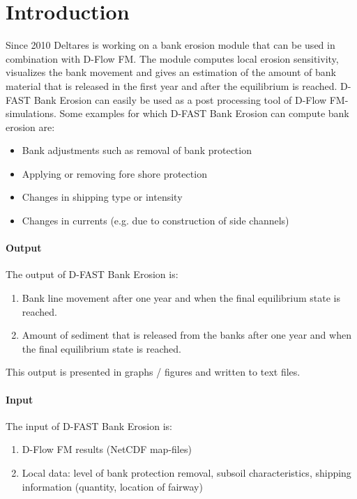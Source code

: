 \chapter{Introduction}

Since 2010 Deltares is working on a bank erosion module that can be used in combination with D-Flow FM.
The module computes local erosion sensitivity, visualizes the bank movement and gives an estimation of the amount of bank material that is released in the first year and after the equilibrium is reached.
D-FAST Bank Erosion can easily be used as a post processing tool of D-Flow FM-simulations.
Some examples for which D-FAST Bank Erosion can compute bank erosion are:

\begin{itemize}
\item Bank adjustments such as removal of bank protection
\item Applying or removing fore shore protection
\item Changes in shipping type or intensity
\item Changes in currents (e.g. due to construction of side channels)
\end{itemize}

\subsubsection*{Output}
The output of D-FAST Bank Erosion is:

\begin{enumerate}
\item Bank line movement after one year and when the final equilibrium state is reached.
\item Amount of sediment that is released from the banks after one year and when the final equilibrium state is reached.
\end{enumerate}

This output is presented in graphs / figures and written to text files.

\subsubsection*{Input}
The input of D-FAST Bank Erosion is:

\begin{enumerate}
\item D-Flow FM results (NetCDF map-files)
\item Local data: level of bank protection removal, subsoil characteristics, shipping information (quantity, location of fairway)
\end{enumerate}

